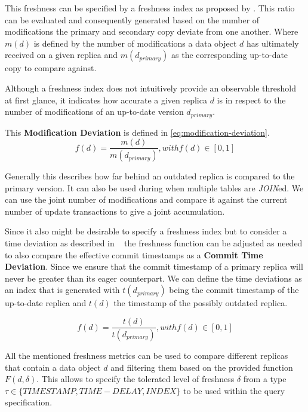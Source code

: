 \begin{description}
        This freshness can be specified by a freshness index as proposed by \cite{rohm:2002}.
        This ratio can be evaluated and consequently generated based on the number of modifications the primary and 
        secondary copy deviate from one another. Where $m(d)$ is defined by the number of modifications a data object $d$ has ultimately received on a given replica
        and $m(d_{primary})$ as the corresponding up-to-date copy to compare against. 

        Although a freshness index does not intuitively provide an observable threshold at first glance, it indicates how accurate a 
        given replica $d$ is in respect to the number of modifications of an up-to-date version $d_{primary}$.

        This \textbf{Modification Deviation} is defined in \ref{eq:modification-deviation}.
        \begin{equation} \label{eq:modification-deviation}
            f(d) = \frac{m(d)}{m(d_{primary})},  with f(d) \in [0,1]
        \end{equation}
        
        Generally this describes how far behind an outdated replica is compared to the primary version.
        It can also be used during when multiple tables are \emph{JOIN}ed.
        We can use the joint number of modifications and compare it against the current number of update transactions to give a joint accumulation.

        Since it also might be desirable to specify a freshness index but to consider a time deviation as described in ~\cite{voicu:2010,hennemann_sw_2021}
        the freshness function can be adjusted as needed to also compare the effective commit timestamps as a \textbf{Commit Time Deviation}.
        Since we ensure that the commit timestamp of a primary replica will never be greater than its eager counterpart. We can define the time deviations as an index that is 
        generated with $t(d_{primary})$ being the commit timestamp of the up-to-date replica and $t(d)$ the timestamp of the possibly outdated replica.


        \begin{equation}
            f(d) = \frac{t(d)}{t(d_{primary})},  with f(d) \in [0,1]
        \end{equation}

\end{description}

All the mentioned freshness metrics can be used to compare different replicas that contain a data object $d$ and filtering them based on the provided function $F(d, \delta)$.
This allows to specify the tolerated level of freshness $\delta$ from a type $\tau \in \{TIMESTAMP, TIME-DELAY, INDEX\}$ to be used within the query specification.

